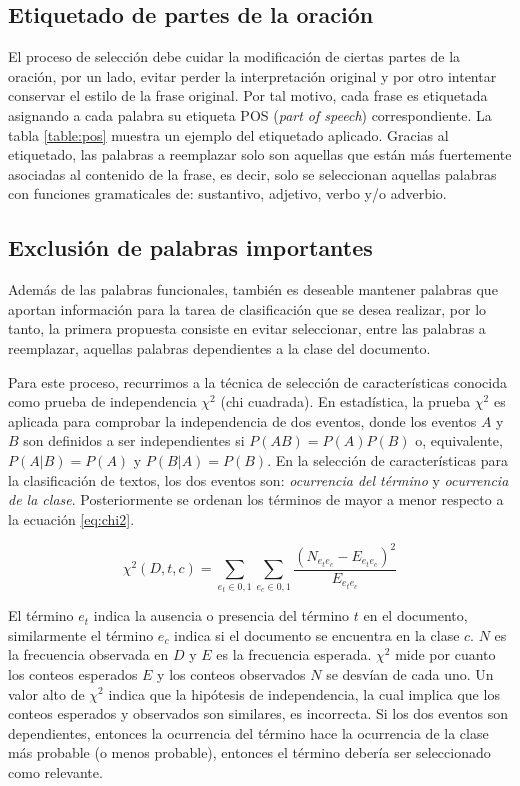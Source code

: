 \subsection{Etiquetado de partes de la oración}
El proceso de selección debe cuidar la modificación de ciertas partes de la oración, por un lado, evitar perder la interpretación original y por otro intentar conservar el estilo de la frase original. Por tal motivo, cada frase es etiquetada asignando a cada palabra su etiqueta POS (\textit{part of speech}) correspondiente. La tabla \ref{table:pos} muestra un ejemplo del etiquetado aplicado. Gracias al etiquetado, las palabras a reemplazar solo son aquellas que están más fuertemente asociadas al contenido de la frase, es decir, solo se seleccionan aquellas palabras con funciones gramaticales de: sustantivo, adjetivo, verbo y/o adverbio.



\subsection{Exclusión de palabras importantes}

Además de las palabras funcionales, también es deseable mantener palabras que aportan información para la tarea de clasificación que se desea realizar, por lo tanto, la primera propuesta consiste en evitar seleccionar, entre las palabras a reemplazar, aquellas palabras dependientes a la clase del documento. 

Para este proceso, recurrimos a la técnica de selección de características conocida como prueba de independencia $\chi^2$ (chi cuadrada). En estadística, la prueba $\chi^2$ es aplicada para comprobar la independencia de dos eventos, donde los eventos $A$ y $B$ son definidos a ser independientes si $P(AB)= P(A)P(B)$ o, equivalente, $P(A|B)=P(A)$ y $P(B|A)=P(B)$. En la selección de características para la clasificación de textos, los dos eventos son: \textit{ocurrencia del término} y \textit{ocurrencia de la clase}. Posteriormente se ordenan los términos de mayor a menor respecto a la ecuación \ref{eq:chi2}.

\begin{equation}
    \label{eq:chi2}
    \chi^2(D, t, c)= \sum_{e_t \in {0,1} }^{} \sum_{e_c \in {0,1} }^{} \frac{(N_{e_t e_c} - E _{e_t e_c})^2}{E_{e_t e_c}}
\end{equation}

El término $e_t$ indica la ausencia o presencia del término $t$ en el documento, similarmente el término $e_c$ indica si el documento se encuentra en la clase $c$. $N$ es la frecuencia observada en $D$ y $E$ es la frecuencia esperada. $\chi^2$ mide por cuanto los conteos esperados $E$ y los conteos observados $N$ se desvían de cada uno. Un valor alto de $\chi^2$ indica que la hipótesis de independencia, la cual implica que los conteos esperados y observados son similares, es incorrecta. Si los dos eventos son dependientes, entonces la ocurrencia del término hace la ocurrencia de la clase más probable (o menos probable), entonces el término debería ser seleccionado como relevante.


